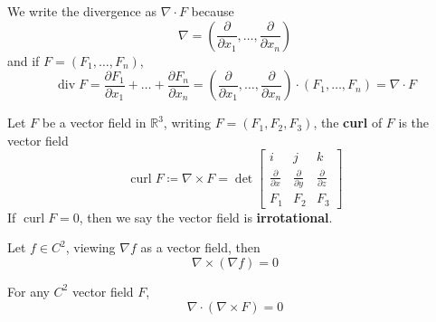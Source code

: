 \documentclass[openany]{book}
\newcommand{\R}{\mathbb{R}}
\newcommand{\diverg}{\operatorname{div}}
\newcommand{\curl}{\operatorname{curl}}
\begin{document}
\begin{remark}
    We write the divergence as $\nabla\cdot F$ because 
    \begin{equation*}
        \nabla=\left(\frac{\partial}{\partial x_1}, \dots, \frac{\partial}{\partial x_n}\right)
    \end{equation*}
    and if $F=(F_1,\dots, F_n)$, 
    \begin{equation*}
        \diverg F=\frac{\partial F_1}{\partial x_1}+\dots+\frac{\partial F_n}{\partial x_n}=\left(\frac{\partial}{\partial x_1}, \dots, \frac{\partial}{\partial x_n}\right)\cdot(F_1,\dots, F_n)=\nabla\cdot F
    \end{equation*}
\end{remark}


\begin{defn}[curl]
    Let $F$ be a vector field in $\R^3$, writing $F=(F_1,F_2,F_3)$, the \textbf{curl} of $F$ is the vector field 
    \begin{equation*}
        \curl F\coloneq\nabla\times F=\det\begin{bmatrix}
            i&j&k\\
            \frac{\partial}{\partial x}&\frac{\partial}{\partial y}&\frac{\partial}{\partial z}\\
            F_1&F_2&F_3
        \end{bmatrix}
    \end{equation*}
    If $\curl F=0$, then we say the vector field is \textbf{irrotational}.
\end{defn}

\begin{prop}
    Let $f\in C^2$, viewing $\nabla f$ as a vector field, then
    \begin{equation*}
        \nabla\times(\nabla f)=0
    \end{equation*}    
\end{prop}

\begin{prop}
    For any $C^2$ vector field $F$, 
    \begin{equation*}
        \nabla\cdot(\nabla\times F)=0
    \end{equation*}
\end{prop}
\end{document}
